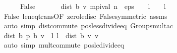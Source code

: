 \begin{isabellebody}
\isanewline
\ \ \ \ \isamarkupfalse%
\ False\isanewline
\ \ \ \ \isamarkupfalse%
\ {\isacharasterisk}{\kern0pt}{\isacharasterisk}{\kern0pt}{\isacharcolon}{\kern0pt}\ {\isachardoublequoteopen}dist\ {\isacharparenleft}{\kern0pt}{\isasymL}\isactrlsub b\ {\isacharquery}{\kern0pt}v{\isacharparenright}{\kern0pt}\ {\isacharparenleft}{\kern0pt}mpi{\isacharunderscore}{\kern0pt}val\ n{\isacharparenright}{\kern0pt}\ {\isacharless}{\kern0pt}\ eps\ {\isacharasterisk}{\kern0pt}\ {\isacharparenleft}{\kern0pt}{}\ {\isacharminus}{\kern0pt}\ l{\isacharparenright}{\kern0pt}\ {\isacharslash}{\kern0pt}\ {\isacharparenleft}{\kern0pt}{}\ {\isacharasterisk}{\kern0pt}\ l{\isacharparenright}{\kern0pt}{\isachardoublequoteclose}\isanewline
\ \ \ \ \ \ \isamarkupfalse%
\ False\ le{\isacharunderscore}{\kern0pt}neq{\isacharunderscore}{\kern0pt}trans{\isacharbrackleft}{\kern0pt}OF\ zero{\isacharunderscore}{\kern0pt}le{\isacharunderscore}{\kern0pt}disc\ False{\isacharbrackleft}{\kern0pt}symmetric{\isacharbrackright}{\kern0pt}{\isacharbrackright}{\kern0pt}\ assms\isanewline
\ \ \ \ \ \ \isamarkupfalse%
\ {\isacharparenleft}{\kern0pt}auto\ simp{\isacharcolon}{\kern0pt}\ dist{\isacharunderscore}{\kern0pt}commute\ pos{\isacharunderscore}{\kern0pt}less{\isacharunderscore}{\kern0pt}divide{\isacharunderscore}{\kern0pt}eq\ Groups{\isachardot}{\kern0pt}mult{\isacharunderscore}{\kern0pt}ac{\isacharparenleft}{\kern0pt}{}{\isacharparenright}{\kern0pt}{\isacharparenright}{\kern0pt}\isanewline
\ \ \ \ \isamarkupfalse%
\ {\isachardoublequoteopen}dist\ {\isacharparenleft}{\kern0pt}{\isasymnu}\isactrlsub b\ {\isacharquery}{\kern0pt}p{\isacharparenright}{\kern0pt}\ {\isacharparenleft}{\kern0pt}{\isasymL}\isactrlsub b\ {\isacharquery}{\kern0pt}v{\isacharparenright}{\kern0pt}\ {\isasymle}\ {\isacharparenleft}{\kern0pt}l{\isacharslash}{\kern0pt}\ {\isacharparenleft}{\kern0pt}{}{\isacharminus}{\kern0pt}l{\isacharparenright}{\kern0pt}{\isacharparenright}{\kern0pt}\ {\isacharasterisk}{\kern0pt}\ dist\ {\isacharparenleft}{\kern0pt}{\isasymL}\isactrlsub b\ {\isacharquery}{\kern0pt}v{\isacharparenright}{\kern0pt}\ {\isacharquery}{\kern0pt}v{\isachardoublequoteclose}\isanewline
\ \ \ \ \ \ \isamarkupfalse%
\ {\isacharasterisk}{\kern0pt}\isanewline
\ \ \ \ \ \ \isamarkupfalse%
\ {\isacharparenleft}{\kern0pt}auto\ simp{\isacharcolon}{\kern0pt}\ mult{\isachardot}{\kern0pt}commute\ pos{\isacharunderscore}{\kern0pt}le{\isacharunderscore}{\kern0pt}divide{\isacharunderscore}{\kern0pt}eq{\isacharparenright}{\kern0pt}\isanewline

\end{isabellebody}
